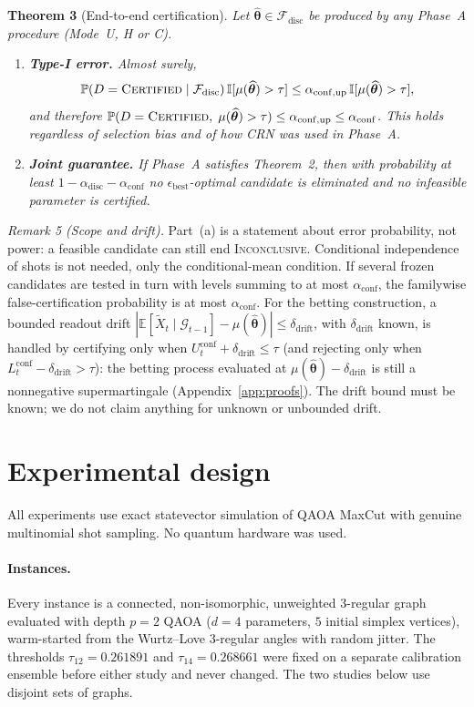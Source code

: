 \documentclass[a4paper,onecolumn,unpublished]{quantumarticle}
\newcommand{\Prob}{\mathbb{P}}
\newcommand{\E}{\mathbb{E}}
\newcommand{\G}{\mathcal{G}}
\newcommand{\ind}{\mathbb{I}}
\newcommand{\Fdisc}{\mathcal{F}_{\mathrm{disc}}}
\newcommand{\adisc}{\alpha_{\mathrm{disc}}}
\newcommand{\aconf}{\alpha_{\mathrm{conf}}}
\newcommand{\aup}{\alpha_{\mathrm{conf,up}}}
\newcommand{\epsbest}{\epsilon_{\mathrm{best}}}
\newcommand{\ddrift}{\delta_{\mathrm{drift}}}
\newcommand{\thhat}{\widehat{\bm{\theta}}}
\begin{document}
\medskip\noindent\textbf{Theorem 3} (End-to-end certification).\label{thm:conf}
\emph{Let $\thhat \in \Fdisc$ be produced by any Phase~A procedure (Mode~U, H or C).}
\begin{enumerate}
  \item[\emph{(a)}] \emph{\textbf{Type-I error.} Almost surely,}
  \begin{equation}
    \Prob(D = \textup{\textsc{Certified}} \mid \Fdisc)\,\ind[\mu(\thhat) > \tau]
    \le \aup\,\ind[\mu(\thhat) > \tau],
    \label{eq:cond_typeI}
  \end{equation}
  \emph{and therefore $\Prob(D = \textup{\textsc{Certified}},\; \mu(\thhat) > \tau) \le \aup \le \aconf$. This holds regardless of selection bias and of how CRN was used in Phase~A.}
  \item[\emph{(b)}] \emph{\textbf{Joint guarantee.} If Phase~A satisfies Theorem~2, then with probability at least $1 - \adisc - \aconf$ no $\epsbest$-optimal candidate is eliminated and no infeasible parameter is certified.}
\end{enumerate}

\medskip\noindent\emph{Remark 5 (Scope and drift).}\label{rem:scope_thm3}
Part~(a) is a statement about error probability, not power: a feasible candidate can still end \textup{\textsc{Inconclusive}}. Conditional independence of shots is not needed, only the conditional-mean condition. If several frozen candidates are tested in turn with levels summing to at most $\aconf$, the familywise false-certification probability is at most $\aconf$. For the betting construction, a bounded readout drift $|\E[\widetilde X_t \mid \G_{t-1}] - \mu(\thhat)| \le \ddrift$, with $\ddrift$ known, is handled by certifying only when $U_t^{\mathrm{conf}} + \ddrift \le \tau$ (and rejecting only when $L_t^{\mathrm{conf}} - \ddrift > \tau$): the betting process evaluated at $\mu(\thhat) - \ddrift$ is still a nonnegative supermartingale (Appendix~\ref{app:proofs}). The drift bound must be known; we do not claim anything for unknown or unbounded drift.

\section{Experimental design}
\label{sec:exp_design}

All experiments use exact statevector simulation of QAOA MaxCut with genuine multinomial shot sampling. No quantum hardware was used.

\paragraph*{Instances.}
Every instance is a connected, non-isomorphic, unweighted 3-regular graph evaluated with depth $p = 2$ QAOA ($d = 4$ parameters, $5$ initial simplex vertices), warm-started from the Wurtz--Love 3-regular angles with random jitter. The thresholds $\tau_{12} = 0.261891$ and $\tau_{14} = 0.268661$ were fixed on a separate calibration ensemble before either study and never changed. The two studies below use disjoint sets of graphs.
\end{document}
